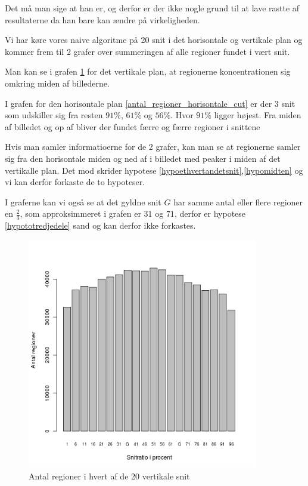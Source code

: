 Det må man sige at han er, og derfor er der ikke nogle grund til at lave
rastte af resultaterne da han bare kan ændre på virkeligheden.

Vi har køre vores naive algoritme på 20 snit i det horisontale og
vertikale plan og kommer frem til 2 grafer over summeringen af alle
regioner fundet i vært snit. 

Man kan se i grafen \ref{antal_regioner_vertikale_cut} for det vertikale
plan, at regionerne koncentrationen sig omkring miden af billederne.

I grafen for den horisontale plan \ref{antal_regioner_horisontale_cut}
er der 3 snit som udskiller sig fra resten $91\%$, $61\%$ og $56\%$.
Hvor $91\%$ ligger højest. Fra miden af billedet og op af bliver der
fundet færre og færre regioner i snittene

Hvis man samler informatioerne for de 2 grafer, kan man se at regionerne
samler sig fra den horisontale miden og ned af i billedet med peaker i
miden af det vertikalle plan. Det mod skrider hypotese \ref{hypoethvertandetsnit},\ref{hypomidten} 
og vi kan derfor forkaste de to hypoteser.

I graferne kan vi også se at det gyldne snit $G$ har samme antal eller
flere regioner en $\frac{2}{3}$, som approksimmeret i grafen er $31$ og
$71$, derfor er hypotese \ref{hypototredjedele} sand og kan derfor ikke forkastes.

\begin{figure}[h!]
	\begin{center}
		\includegraphics[width=0.9\textwidth]{afsnit/resultater/billeder/cut0cut1eatsperratio.png}
	\end{center}
	\caption{Antal regioner i hvert af de 20 vertikale snit}
	\label{antal_regioner_vertikale_cut}
\end{figure}

